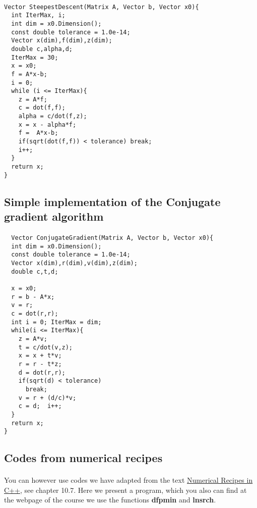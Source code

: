 \documentclass[%
twoside,                 %
final,                   %
10pt]{article}
\begin{document}
\paragraph{}
\begin{verbatim}
Vector SteepestDescent(Matrix A, Vector b, Vector x0){
  int IterMax, i;
  int dim = x0.Dimension();
  const double tolerance = 1.0e-14;
  Vector x(dim),f(dim),z(dim);
  double c,alpha,d;
  IterMax = 30;
  x = x0;
  f = A*x-b;
  i = 0;
  while (i <= IterMax){
    z = A*f;
    c = dot(f,f);
    alpha = c/dot(f,z);
    x = x - alpha*f;
    f =  A*x-b;
    if(sqrt(dot(f,f)) < tolerance) break;
    i++;
  }
  return x;
} 
\end{verbatim}




\subsection*{Simple implementation of the Conjugate gradient algorithm}

\paragraph{}
\begin{verbatim}
  Vector ConjugateGradient(Matrix A, Vector b, Vector x0){
  int dim = x0.Dimension();
  const double tolerance = 1.0e-14;
  Vector x(dim),r(dim),v(dim),z(dim);
  double c,t,d;

  x = x0;
  r = b - A*x;
  v = r;
  c = dot(r,r);
  int i = 0; IterMax = dim;
  while(i <= IterMax){
    z = A*v;
    t = c/dot(v,z);
    x = x + t*v;
    r = r - t*z;
    d = dot(r,r);
    if(sqrt(d) < tolerance)
      break;
    v = r + (d/c)*v;
    c = d;  i++;
  }
  return x;
} 
\end{verbatim}




\subsection*{Codes from numerical recipes}

\paragraph{}
You can however use codes we have adapted from the text \href{{http://www.nr.com/}}{Numerical Recipes in C++}, see chapter 10.7.  
Here we present a program, which you also can find at the webpage of the course we use the functions \textbf{dfpmin} and \textbf{lnsrch}.  
\end{document}
